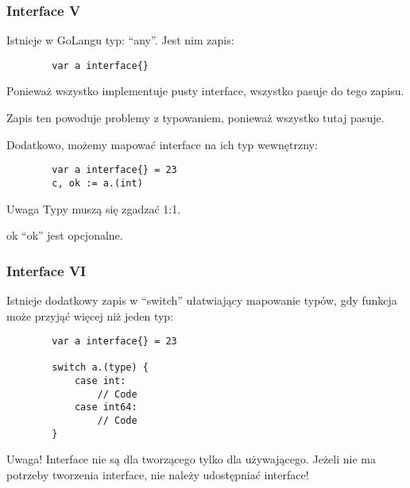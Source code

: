 \documentclass[10pt]{beamer}
\newcommand{\quotes}[1]{``#1''}
\begin{document}
\begin{frame}[fragile]
    \frametitle{Interface V}
    Istnieje w GoLangu typ: \quotes{any}. Jest nim zapis:
    \begin{verbatim}
        var a interface{}
    \end{verbatim}

    Ponieważ wszystko implementuje pusty interface, wszystko pasuje do tego zapisu.

    Zapis ten powoduje problemy z typowaniem, ponieważ wszystko tutaj pasuje.

    Dodatkowo, możemy mapować interface na ich typ wewnętrzny:

    \begin{verbatim}
        var a interface{} = 23
        c, ok := a.(int)
    \end{verbatim}

    \begin{alertblock}{Uwaga}
        Typy muszą się zgadzać 1:1.
    \end{alertblock}

    \begin{block}{ok}
        \quotes{ok} jest opcjonalne.
    \end{block}
\end{frame}

\begin{frame}[fragile]
    \frametitle{Interface VI}
    Istnieje dodatkowy zapis w \quotes{switch} ułatwiający mapowanie typów, gdy
    funkcja może przyjąć więcej niż jeden typ:

    \begin{verbatim}
        var a interface{} = 23

        switch a.(type) {
            case int:
                // Code
            case int64:
                // Code
        }
    \end{verbatim}

    \begin{alertblock}{Uwaga!}
        Interface nie są dla tworzącego tylko dla używającego. Jeżeli nie ma 
        potrzeby tworzenia interface, nie należy udostępniać interface!
    \end{alertblock}
\end{frame}
\end{document}
